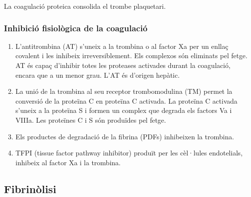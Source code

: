 La coagulació proteica consolida el trombe plaquetari.

\subsubsection{Inhibició fisiològica de la coagulació}
\label{sec:inhib-fisi-de}
\begin{enumerate}
\item L'antitrombina (AT) s'uneix a la trombina o al factor Xa per un
  enllaç covalent i les inhibeix irreversiblement. Els complexos són
  eliminats pel fetge. AT és capaç d'inhibir totes les proteases
  activades durant la coagulació, encara que a un menor grau. L’AT és
  d’origen hepàtic.

\item La unió de la trombina al seu receptor trombomodulina (TM)
  permet la conversió de la proteïna C en proteïna C activada. La
  proteïna C activada s’uneix a la proteïna S i formen un complex que
  degrada els factors Va i VIIIa. Les proteïnes C i S són produïdes
  pel fetge.

\item Els productes de degradació de la fibrina (PDFs) inhibeixen la
  trombina.

\item TFPI (tissue factor pathway inhibitor) produït per les cèl·lules
  endotelials, inhibeix al factor Xa i la trombina.
\end{enumerate}

\subsection{Fibrinòlisi}
